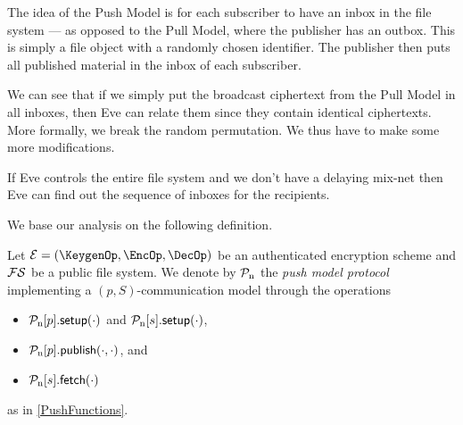 The idea of the Push Model is for each subscriber to have an inbox in the file 
system --- as opposed to the Pull Model, where the publisher has an outbox.
This is simply a file object with a randomly chosen identifier.
The publisher then puts all published material in the inbox of each subscriber.

We can see that if we simply put the broadcast ciphertext from the Pull Model 
in all inboxes, then Eve can relate them since they contain identical 
ciphertexts.
More formally, we break the random permutation.
We thus have to make some more modifications.

If Eve controls the entire file system and we don't have a delaying mix-net 
then Eve can find out the sequence of inboxes for the recipients.

We base our analysis on the following definition.

\begin{definition}\label{PushModel}
  Let \(\mathcal{E} = (\KeygenOp, \EncOp, \DecOp)\) be an authenticated 
  encryption scheme and \(\operatorname{\mathcal{FS}}\) be a public file system.
  We denote by \(\operatorname{\mathcal{P}_n}\) the \emph{push model protocol} implementing a \((p, 
    S)\)-communication model through the operations
  \begin{itemize}
    \item \(\pnsetup{p}[\cdot]\) and \(\pnsetup{s}[\cdot]\),
    \item \(\pnpub{p}[\cdot][\cdot]\), and
    \item \(\pnget{s}[\cdot]\)
  \end{itemize}
  as in \cref{PushFunctions}.
\end{definition}

